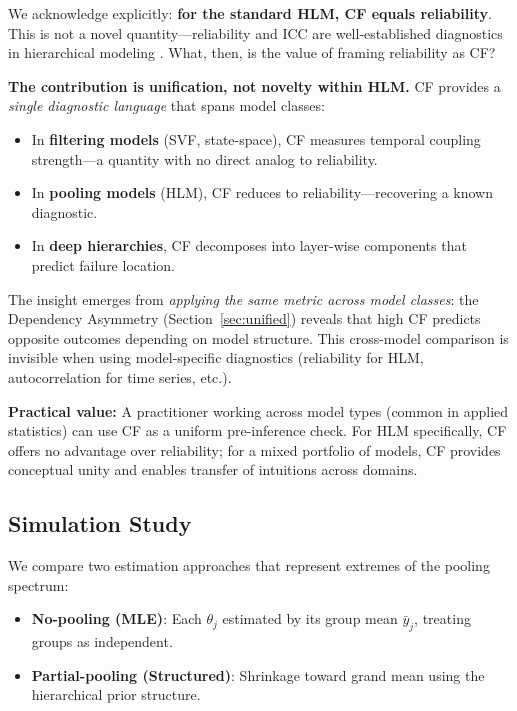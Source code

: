\documentclass[10pt]{article} %
\theoremstyle{plain}
\theoremstyle{definition}
\begin{document}
\begin{tcolorbox}[breakable, colback=yellow!10, colframe=orange!50!black, title=\textbf{Clarification: CF Reduces to Reliability for HLM}, fonttitle=\bfseries]
\label{box:hlm-reliability}
We acknowledge explicitly: \textbf{for the standard HLM, CF equals reliability}. This is not a novel quantity---reliability and ICC are well-established diagnostics in hierarchical modeling \citep{raudenbush1986hierarchical}. What, then, is the value of framing reliability as CF?

\textbf{The contribution is unification, not novelty within HLM.} CF provides a \emph{single diagnostic language} that spans model classes:
\begin{itemize}
    \item In \textbf{filtering models} (SVF, state-space), CF measures temporal coupling strength---a quantity with no direct analog to reliability.
    \item In \textbf{pooling models} (HLM), CF reduces to reliability---recovering a known diagnostic.
    \item In \textbf{deep hierarchies}, CF decomposes into layer-wise components that predict failure location.
\end{itemize}

The insight emerges from \emph{applying the same metric across model classes}: the Dependency Asymmetry (Section~\ref{sec:unified}) reveals that high CF predicts opposite outcomes depending on model structure. This cross-model comparison is invisible when using model-specific diagnostics (reliability for HLM, autocorrelation for time series, etc.).

\textbf{Practical value:} A practitioner working across model types (common in applied statistics) can use CF as a uniform pre-inference check. For HLM specifically, CF offers no advantage over reliability; for a mixed portfolio of models, CF provides conceptual unity and enables transfer of intuitions across domains.
\end{tcolorbox}

\subsection{Simulation Study}

We compare two estimation approaches that represent extremes of the pooling spectrum:
\begin{itemize}
    \item \textbf{No-pooling (MLE)}: Each $\theta_j$ estimated by its group mean $\bar{y}_j$, treating groups as independent.
    \item \textbf{Partial-pooling (Structured)}: Shrinkage toward grand mean using the hierarchical prior structure.
\end{itemize}
\end{document}
